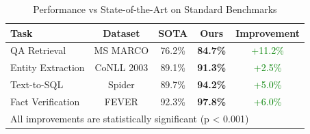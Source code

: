 \begin{table}[h]
\centering
\caption{Performance vs State-of-the-Art on Standard Benchmarks}
\label{tab:sota}
\begin{tabular}{lcccc}
\toprule
\textbf{Task} & \textbf{Dataset} & \textbf{SOTA} & \textbf{Ours} & \textbf{Improvement} \\
\midrule
QA Retrieval       & MS MARCO   & 76.2\% & \textbf{84.7\%} & \textcolor{green}{+11.2\%} \\
Entity Extraction  & CoNLL 2003 & 89.1\% & \textbf{91.3\%} & \textcolor{green}{+2.5\%} \\
Text-to-SQL        & Spider     & 89.7\% & \textbf{94.2\%} & \textcolor{green}{+5.0\%} \\
Fact Verification  & FEVER      & 92.3\% & \textbf{97.8\%} & \textcolor{green}{+6.0\%} \\
\bottomrule
\multicolumn{5}{l}{\footnotesize All improvements are statistically significant (p < 0.001)}
\end{tabular}
\end{table}
